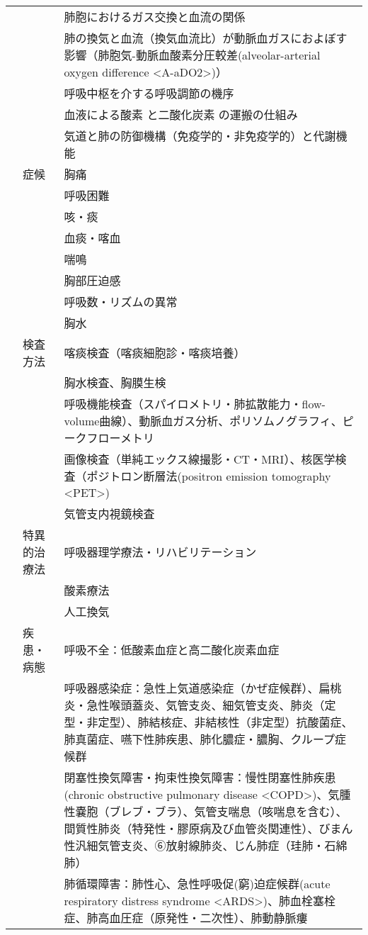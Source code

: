 \documentclass[
]{ltjsarticle}
\begin{document}
\begin{xltabular}{\linewidth}{XXX}
 &  & 肺胞におけるガス交換と血流の関係 \\
 &  & 肺の換気と血流（換気血流比）が動脈血ガスにおよぼす影響（肺胞気-動脈血酸素分圧較差(alveolar-arterial oxygen difference <A-aDO2>)） \\
 &  & 呼吸中枢を介する呼吸調節の機序 \\
 &  & 血液による酸素 と二酸化炭素 の運搬の仕組み \\
 &  & 気道と肺の防御機構（免疫学的・非免疫学的）と代謝機能 \\
 & 症候 & 胸痛 \\
 &  & 呼吸困難 \\
 &  & 咳・痰 \\
 &  & 血痰・喀血 \\
 &  & 喘鳴 \\
 &  & 胸部圧迫感 \\
 &  & 呼吸数・リズムの異常 \\
 &  & 胸水 \\
 & 検査方法 & 喀痰検査（喀痰細胞診・喀痰培養） \\
 &  & 胸水検査、胸膜生検 \\
 &  & 呼吸機能検査（スパイロメトリ・肺拡散能力・flow-volume曲線）、動脈血ガス分析、ポリソムノグラフィ、ピークフローメトリ \\
 &  & 画像検査（単純エックス線撮影・CT・MRI）、核医学検査（ポジトロン断層法(positron emission tomography <PET>) \\
 &  & 気管支内視鏡検査 \\
 & 特異的治療法 & 呼吸器理学療法・リハビリテーション \\
 &  & 酸素療法 \\
 &  & 人工換気 \\
 & 疾患・病態 & 呼吸不全：低酸素血症と高二酸化炭素血症 \\
 &  & 呼吸器感染症：急性上気道感染症（かぜ症候群）、扁桃炎・急性喉頭蓋炎、気管支炎、細気管支炎、肺炎（定型・非定型）、肺結核症、非結核性（非定型）抗酸菌症、肺真菌症、嚥下性肺疾患、肺化膿症・膿胸、クループ症候群 \\
 &  & 閉塞性換気障害・拘束性換気障害：慢性閉塞性肺疾患(chronic obstructive pulmonary disease <COPD>)、気腫性嚢胞（ブレブ・ブラ）、気管支喘息（咳喘息を含む）、間質性肺炎（特発性・膠原病及び血管炎関連性）、びまん性汎細気管支炎、➅放射線肺炎、じん肺症（珪肺・石綿肺） \\
 &  & 肺循環障害：肺性心、急性呼吸促(窮)迫症候群(acute respiratory distress syndrome <ARDS>)、肺血栓塞栓症、肺高血圧症（原発性・二次性）、肺動静脈瘻 \\

\end{xltabular}
\end{document}
